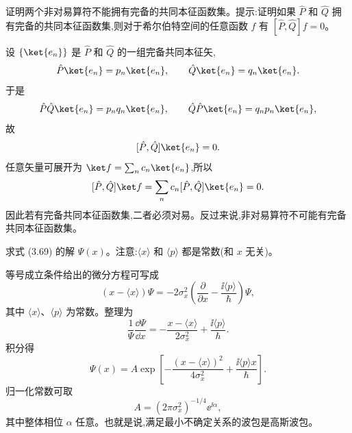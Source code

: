 \begin{question}
证明两个非对易算符不能拥有完备的共同本征函数集。提示:证明如果 $\hat P$ 和 $\hat Q$ 拥有完备的共同本征函数集,则对于希尔伯特空间的任意函数 $f$ 有 $[\hat P,\hat Q]f=0$。
\end{question}
\begin{solution}
设 $\{\ket{e_n}\}$ 是 $\hat P$ 和 $\hat Q$ 的一组完备共同本征矢,
\[
\hat P\ket{e_n}=p_n\ket{e_n},
\qquad
\hat Q\ket{e_n}=q_n\ket{e_n}.
\]
于是
\[
\hat P\hat Q\ket{e_n}=p_nq_n\ket{e_n},
\qquad
\hat Q\hat P\ket{e_n}=q_np_n\ket{e_n},
\]
故
\[
[\hat P,\hat Q]\ket{e_n}=0.
\]
任意矢量可展开为 $\ket f=\sum_n c_n\ket{e_n}$,所以
\[
[\hat P,\hat Q]\ket f=\sum_n c_n[\hat P,\hat Q]\ket{e_n}=0.
\]
因此若有完备共同本征函数集,二者必须对易。反过来说,非对易算符不可能有完备共同本征函数集。
\end{solution}

\begin{question}
求式 (3.69) 的解 $\Psi(x)$。注意:$\langle x\rangle$ 和 $\langle p\rangle$ 都是常数(和 $x$ 无关)。

\par\smallskip
{}

\end{question}
\begin{solution}
等号成立条件给出的微分方程可写成
\[
\left(x-\langle x\rangle\right)\Psi
=-2\sigma_x^2\left(\frac{\partial}{\partial x}-\frac{\ii\langle p\rangle}{\hbar}\right)\Psi,
\]
其中 $\langle x\rangle$、$\langle p\rangle$ 为常数。整理为
\[
\frac1\Psi\frac{\dd\Psi}{\dd x}
=-\frac{x-\langle x\rangle}{2\sigma_x^2}+\frac{\ii\langle p\rangle}{\hbar}.
\]
积分得
\[
\Psi(x)=A\exp\left[-\frac{(x-\langle x\rangle)^2}{4\sigma_x^2}
+\frac{\ii\langle p\rangle x}{\hbar}\right].
\]
归一化常数可取
\[
A=(2\pi\sigma_x^2)^{-1/4}\ee^{\ii\alpha},
\]
其中整体相位 $\alpha$ 任意。也就是说,满足最小不确定关系的波包是高斯波包。
\end{solution}


